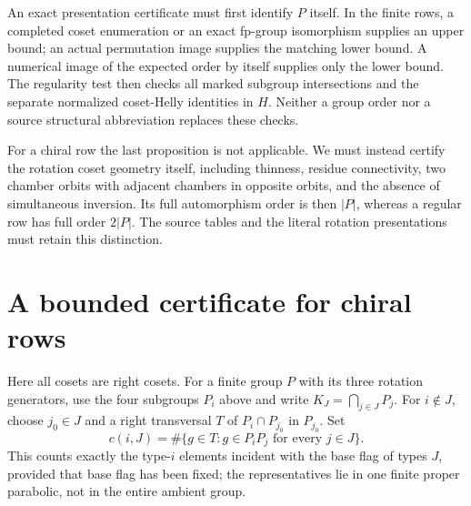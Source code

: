 An exact presentation certificate must first identify $P$ itself. In the finite
rows, a completed coset enumeration or an exact fp-group isomorphism supplies
an upper bound; an actual permutation image supplies the matching lower bound.
A numerical image of the expected order by itself supplies only the lower bound.
The regularity test then checks all marked subgroup intersections and the separate
normalized coset-Helly identities in $H$. Neither a group order nor a source
structural abbreviation replaces these checks.

For a chiral row the last proposition is not applicable. We must instead certify
the rotation coset geometry itself, including thinness, residue connectivity,
two chamber orbits with adjacent chambers in opposite orbits, and the absence
of simultaneous inversion. Its full automorphism order is then $|P|$, whereas
a regular row has full order $2|P|$. The source tables and the literal rotation
presentations must retain this distinction.

\section*{A bounded certificate for chiral rows}
Here all cosets are right cosets. For a finite group $P$ with its three
rotation generators, use the four subgroups $P_i$ above and write
$K_J=\bigcap_{j\in J}P_j$. For $i\notin J$, choose $j_0\in J$ and a
right transversal $T$ of $P_i\cap P_{j_0}$ in $P_{j_0}$. Set
\[
 c(i,J)=\#\{g\in T:g\in P_iP_j\text{ for every }j\in J\}.
\]
This counts exactly the type-$i$ elements incident with the base flag of
types $J$, provided that base flag has been fixed; the representatives lie
in one finite proper parabolic, not in the entire ambient group.

